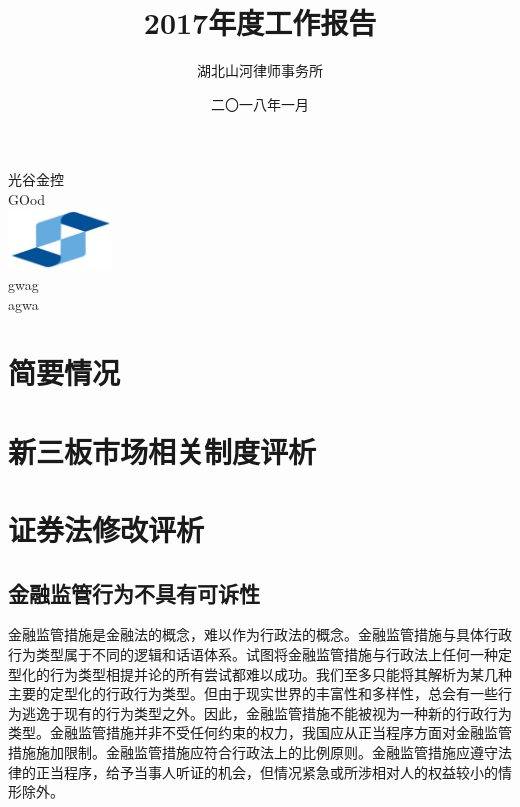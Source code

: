 \documentclass[UTF8]{ctexart}
\numberwithin{equation}{section} %
\begin{document}
\newcommand{\Customer}{光谷金控}
\title{\heiti 2017年度工作报告}
\author{湖北山河律师事务所}
\date{二〇一八年一月}


\begin{titlepage}
\begin{center}
    \vspace*{4em}
\Customer\\
{ \heiti  GOod}\\
\vspace{6em}
\includegraphics[height=1.61cm]{logo-sh.png}\\
{gwag}\\
{agwa}\\
\end{center}

\thispagestyle{empty}
\end{titlepage}

\thispagestyle{empty}
\tableofcontents
\newpage
\setcounter{page}{1}
\section{简要情况} %
\label{sec:简要情况}


\section{新三板市场相关制度评析} %
\label{sec:新三板市场相关制度评析}


\section{证券法修改评析} %
\label{sec:证券法修改评析}
	\subsection{金融监管行为不具有可诉性} %
	\label{sub:金融监管行为不具有可诉性}
	金融监管措施是金融法的概念，难以作为行政法的概念。金融监管措施与具体行政行为类型属于不同的逻辑和话语体系。试图将金融监管措施与行政法上任何一种定型化的行为类型相提并论的所有尝试都难以成功。我们至多只能将其解析为某几种主要的定型化的行政行为类型。但由于现实世界的丰富性和多样性，总会有一些行为逃逸于现有的行为类型之外。因此，金融监管措施不能被视为一种新的行政行为类型。金融监管措施并非不受任何约束的权力，我国应从正当程序方面对金融监管措施施加限制。金融监管措施应符合行政法上的比例原则。金融监管措施应遵守法律的正当程序，给予当事人听证的机会，但情况紧急或所涉相对人的权益较小的情形除外。\cite{}
\end{document}

